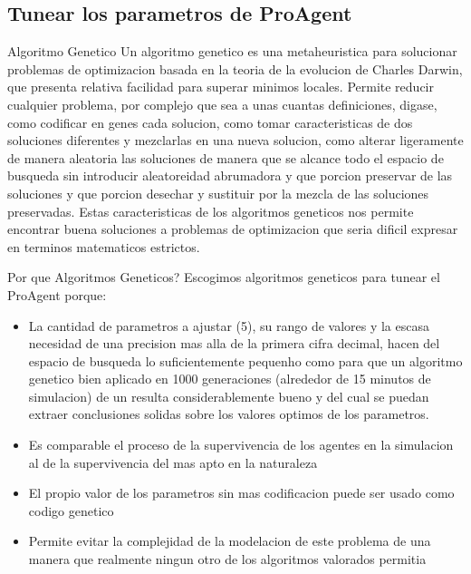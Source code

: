 \documentclass{beamer}
\begin{document}
\subsection{Tunear los parametros de ProAgent}
\begin{frame}{Algoritmo Genetico}
    Un algoritmo genetico es una metaheuristica para solucionar problemas de optimizacion basada en la teoria de la evolucion de Charles Darwin, que presenta relativa facilidad para superar minimos locales. Permite reducir cualquier problema, por complejo que sea a unas cuantas definiciones, digase, como codificar en genes cada solucion, como tomar caracteristicas de dos soluciones diferentes y mezclarlas en una nueva solucion, como alterar ligeramente de manera aleatoria las soluciones de manera que se alcance todo el espacio de busqueda sin introducir aleatoreidad abrumadora y que porcion preservar de las soluciones y que porcion desechar y sustituir por la mezcla de las soluciones preservadas.
    Estas caracteristicas de los algoritmos geneticos nos permite encontrar buena soluciones a problemas de optimizacion que seria dificil expresar en terminos matematicos estrictos.
\end{frame}

\begin{frame}{Por que Algoritmos Geneticos?}
    Escogimos algoritmos geneticos para tunear el ProAgent porque:
    \begin{itemize}
        \item La cantidad de parametros a ajustar (5), su rango de valores y la escasa necesidad de una precision mas alla de la primera cifra decimal, hacen del espacio de busqueda lo suficientemente pequenho como para que un algoritmo genetico bien aplicado en 1000 generaciones (alrededor de 15 minutos de simulacion) de un resulta considerablemente bueno y del cual se puedan extraer conclusiones solidas sobre los valores optimos de los parametros.
        \item Es comparable el proceso de la supervivencia de los agentes en la simulacion al de la supervivencia del mas apto en la naturaleza
        \item El propio valor de los parametros sin mas codificacion puede ser usado como codigo genetico
        \item Permite evitar la complejidad de la modelacion de este problema de una manera que realmente ningun otro de los algoritmos valorados permitia
    \end{itemize}
\end{frame}
\end{document}
